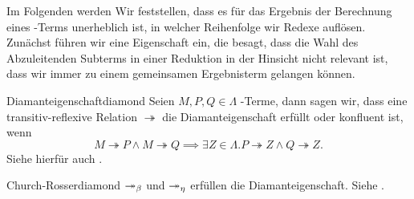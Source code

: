 Im Folgenden werden Wir feststellen, dass es für das Ergebnis der Berechnung eines \tlambda-Terms unerheblich ist, in welcher Reihenfolge wir Redexe auflösen. Zunächst führen wir eine Eigenschaft ein, die besagt, dass die Wahl des Abzuleitenden Subterms in einer Reduktion in der Hinsicht nicht relevant ist, dass wir immer zu einem gemeinsamen Ergebnisterm gelangen können.

\begin{definition}{Diamanteigenschaft}{diamond}
    Seien $M,P,Q\in\Lambda$ \tlambda-Terme, dann sagen wir, dass eine transitiv-reflexive Relation $\twoheadrightarrow$ die Diamanteigenschaft erfüllt oder konfluent ist, wenn
    \[M\twoheadrightarrow P \land M\twoheadrightarrow Q\implies \exists Z\in\Lambda. P\twoheadrightarrow Z \land Q\twoheadrightarrow Z. \]
    Siehe hierfür auch .
\end{definition}
\begin{proposition}{Church-Rosser}{diamond}
    $\twoheadrightarrow_\beta$ und $\twoheadrightarrow_\eta$ erfüllen die Diamanteigenschaft.
    \Proof
%
%          
%          
Siehe \cite{lecturesCH}.
\end{proposition}     


